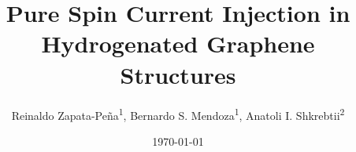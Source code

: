 \documentclass[prb,11pt,tightenlines,twocolumn,aps]{revtex4-1}
\begin{document}
\title{Pure Spin Current Injection in Hydrogenated Graphene Structures}
\author{Reinaldo Zapata-Pe\~na\textsuperscript{1},
        Bernardo S. Mendoza\textsuperscript{1},
        Anatoli I. Shkrebtii\textsuperscript{2}}

\date{\today}

\begin{abstract}
\blindtext
\end{abstract}

\maketitle
\end{document}
